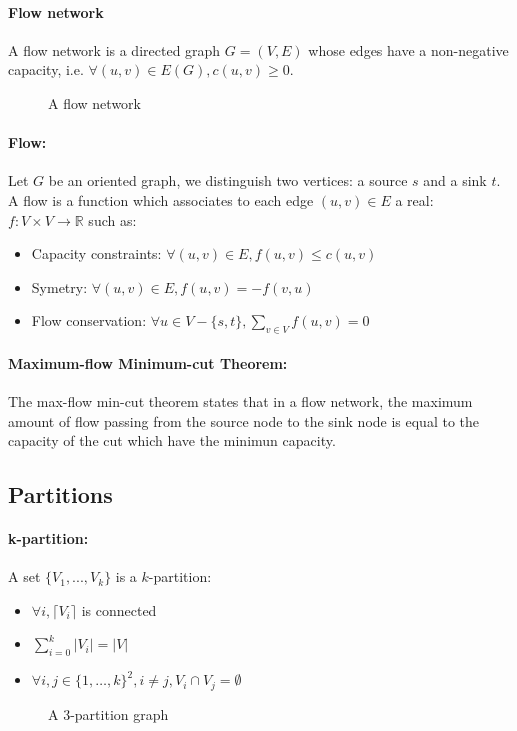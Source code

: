 \paragraph{Flow network}
A flow network is a directed graph $G=(V,E)$ whose edges have a non-negative
capacity, i.e. $\forall (u,v) \in E(G), c(u,v) \geq 0$.

\begin{figure}[!h]
  \begin{center}
    
  \end{center}
  \caption{A flow network}
\end{figure}

\paragraph{Flow:}
Let $G$ be an oriented graph, we distinguish two vertices: a source $s$ and a
sink $t$.
A flow is a function which associates to each edge $(u,v) \in E$ a real:
$f: V \times V \rightarrow \mathbb{R}$ such as:
\begin{itemize}
    \item Capacity constraints: $\forall (u,v) \in E, f(u,v) \leq c(u,v)$
    \item Symetry: $\forall (u,v) \in E, f(u,v) = - f(v,u) $
    \item Flow conservation: $\forall u \in V - \{s,t\}, \sum_{v \in V}f(u,v) = 0$ 
\end{itemize}


\paragraph{Maximum-flow Minimum-cut Theorem:}
The max-flow min-cut theorem states that in a flow network, the maximum amount
of flow passing from the source node to the sink node is equal to the capacity
of the cut which have the minimun capacity.

\subsection{Partitions}
\paragraph{k-partition:}
A set $\{V_1,...,V_k\}$ is a $k$-partition:
\begin{itemize}
    \item $\forall i, \lceil V_i \rceil$ is connected
    \item $\sum\limits_{i=0}^k|V_i| = |V|$
    \item $\forall i,j \in \{1, \dots, k\}^2, i \neq j, V_i \cap V_j = \emptyset$
\end{itemize}

\begin{figure}[!h]
    \begin{center}
        
    \end{center}
    \caption{A 3-partition graph}
\end{figure}

